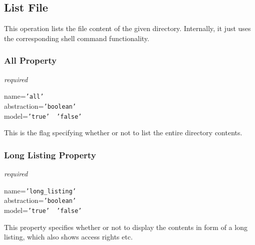 %
%
%
%
%
%

\subsection{List File}
\label{list_file_heading}

This operation lists the file content of the given directory. Internally, it
just uses the corresponding shell command functionality.

\subsubsection{All Property}

\emph{required}

name=\texttt{'all'}\\
abstraction=\texttt{'boolean'}\\
model=\texttt{'true' \vline\ 'false'}

This is the flag specifying whether or not to list the entire directory contents.

\subsubsection{Long Listing Property}

\emph{required}

name=\texttt{'long\_listing'}\\
abstraction=\texttt{'boolean'}\\
model=\texttt{'true' \vline\ 'false'}

This property specifies whether or not to display the contents in form of a
long listing, which also shows access rights etc.
